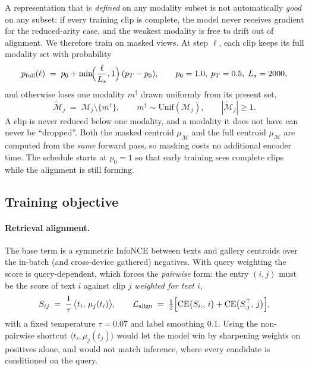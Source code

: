 A representation that is \emph{defined} on any modality subset is not automatically
\emph{good} on any subset: if every training clip is complete, the model never
receives gradient for the reduced-arity case, and the weakest modality is free to
drift out of alignment. We therefore train on masked views. At step $\ell$, each clip
keeps its full modality set with probability
\begin{equation}
  p_{\mathrm{full}}(\ell) \;=\; p_0 + \min\!\Bigl(\frac{\ell}{L_s}, 1\Bigr)\,(p_T - p_0),
  \qquad p_0 = 1.0,\; p_T = 0.5,\; L_s = 2000,
  \label{eq:schedule}
\end{equation}
and otherwise loses one modality $m^\dagger$ drawn uniformly from its present set,
\begin{equation}
  \tilde{\mathcal{M}}_j \;=\; \mathcal{M}_j \setminus \{m^\dagger\},
  \qquad m^\dagger \sim \mathrm{Unif}(\mathcal{M}_j),
  \qquad |\tilde{\mathcal{M}}_j| \geq 1 .
  \label{eq:mdagger}
\end{equation}
A clip is never reduced below one modality, and a modality it does not have can never
be ``dropped''. Both the masked centroid $\mu_{\tilde{\mathcal{M}}}$ and the full
centroid $\mu_{\mathcal{M}}$ are computed from the \emph{same} forward pass, so
masking costs no additional encoder time. The schedule starts at $p_0 = 1$ so that
early training sees complete clips while the alignment is still forming.

\subsection{Training objective}

\paragraph{Retrieval alignment.}
The base term is a symmetric InfoNCE between texts and gallery centroids over the
in-batch (and cross-device gathered) negatives. With query weighting the score is
query-dependent, which forces the \emph{pairwise} form: the entry $(i, j)$ must be
the score of text $i$ against clip $j$ \emph{weighted for text $i$},
\begin{equation}
  S_{ij} \;=\; \frac{1}{\tau}\,\bigl\langle t_i,\, \mu_j(t_i) \bigr\rangle,
  \qquad
  \mathcal{L}_{\mathrm{align}} \;=\; \tfrac{1}{2}\Bigl[
    \mathrm{CE}\bigl(S_{i:},\, i\bigr) + \mathrm{CE}\bigl(S_{:j}^{\top},\, j\bigr)
  \Bigr],
  \label{eq:align}
\end{equation}
with a fixed temperature $\tau = 0.07$ and label smoothing $0.1$. Using the
non-pairwise shortcut $\langle t_i, \mu_j(t_j)\rangle$ would let the model win by
sharpening weights on positives alone, and would not match inference, where every
candidate is conditioned on the query.

